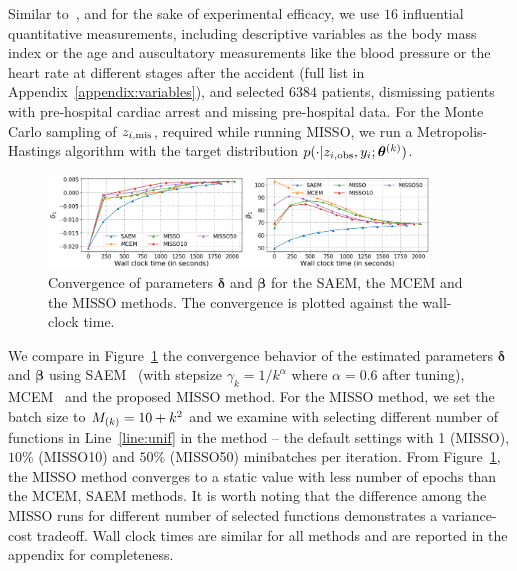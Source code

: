 \documentclass[final,12pt]{alt2022} %
\begin{document}
Similar to~\cite{jiang2018logistic}, and for the sake of experimental efficacy, we use $16$ influential quantitative measurements, including descriptive variables as the body mass index or the age and auscultatory measurements like the blood pressure or the heart rate at different stages after the accident (full list in Appendix~\ref{appendix:variables}), and selected $6384$ patients, dismissing patients with pre-hospital cardiac arrest and missing pre-hospital data.
For the Monte Carlo sampling of $z_{i,\mis}$, required while running MISSO, we run a Metropolis-Hastings algorithm with the target distribution $p( \cdot |z_{i,\obs}, y_i; \hp{k})$.
\begin{figure}[t]
\includegraphics[width=0.9\textwidth]{figure/traumabasenoexp_wallclock.png}\vspace{-.2cm}
\caption{Convergence of parameters ${\bm \delta}$ and ${\bm \beta}$ for the SAEM, the MCEM and the MISSO methods. The convergence is plotted against the wall-clock time.}
\vspace{-0.1in}
\label{fig:misso_trauma}
\end{figure}
We compare in Figure~\ref{fig:misso_trauma} the convergence behavior of the estimated parameters $\bm{\delta}$ and $\bm{\beta}$ using SAEM~\cite{delyon1999} (with stepsize $\gamma_k = 1/k^{\alpha}$ where $\alpha = 0.6$ after tuning), MCEM~\cite{wei1990mcem}  and the proposed MISSO method.
For the MISSO method, we set the batch size to $\Bsize{k} = 10 + k^2$ and we examine with selecting different number of functions in Line~\ref{line:unif} in the method -- the default settings with 1 (MISSO), $10\%$ (MISSO10) and $50\%$ (MISSO50) minibatches per iteration.
From Figure~\ref{fig:misso_trauma}, the MISSO method converges to a static value with less number of epochs than the MCEM, SAEM methods.
It is worth noting that the difference among the MISSO runs for different number of selected functions demonstrates a variance-cost tradeoff.
Wall clock times are similar for all methods and are reported in the appendix for completeness.


\vspace{-0.15in}
\end{document}
